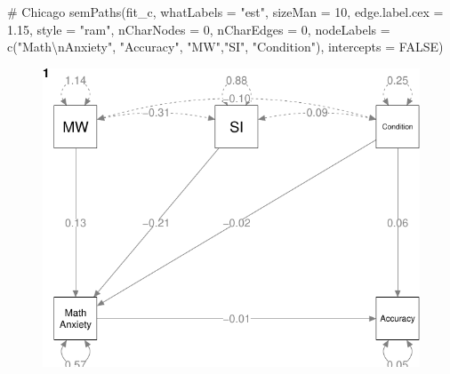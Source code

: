 \documentclass[
  letterpaper,
  DIV=11,
  numbers=noendperiod]{scrartcl}
\newenvironment{Shaded}{\begin{snugshade}}{\end{snugshade}}
\newcommand{\AttributeTok}[1]{\textcolor[rgb]{0.40,0.45,0.13}{#1}}
\newcommand{\CommentTok}[1]{\textcolor[rgb]{0.37,0.37,0.37}{#1}}
\newcommand{\ConstantTok}[1]{\textcolor[rgb]{0.56,0.35,0.01}{#1}}
\newcommand{\DecValTok}[1]{\textcolor[rgb]{0.68,0.00,0.00}{#1}}
\newcommand{\FloatTok}[1]{\textcolor[rgb]{0.68,0.00,0.00}{#1}}
\newcommand{\FunctionTok}[1]{\textcolor[rgb]{0.28,0.35,0.67}{#1}}
\newcommand{\NormalTok}[1]{\textcolor[rgb]{0.00,0.23,0.31}{#1}}
\newcommand{\SpecialCharTok}[1]{\textcolor[rgb]{0.37,0.37,0.37}{#1}}
\newcommand{\StringTok}[1]{\textcolor[rgb]{0.13,0.47,0.30}{#1}}
\begin{document}
\begin{Shaded}
\begin{Highlighting}[]
\CommentTok{\# Chicago}
\FunctionTok{semPaths}\NormalTok{(fit\_c,}
         \AttributeTok{whatLabels =} \StringTok{"est"}\NormalTok{,}
         \AttributeTok{sizeMan =} \DecValTok{10}\NormalTok{,}
         \AttributeTok{edge.label.cex =} \FloatTok{1.15}\NormalTok{,}
         \AttributeTok{style =} \StringTok{"ram"}\NormalTok{,}
         \AttributeTok{nCharNodes =} \DecValTok{0}\NormalTok{, }\AttributeTok{nCharEdges =} \DecValTok{0}\NormalTok{,}
         \AttributeTok{nodeLabels =} \FunctionTok{c}\NormalTok{(}\StringTok{"Math}\SpecialCharTok{\textbackslash{}n}\StringTok{Anxiety"}\NormalTok{, }\StringTok{"Accuracy"}\NormalTok{,}
                        \StringTok{"MW"}\NormalTok{,}\StringTok{"SI"}\NormalTok{, }\StringTok{"Condition"}\NormalTok{),}
         \AttributeTok{intercepts =} \ConstantTok{FALSE}\NormalTok{)}
\end{Highlighting}
\end{Shaded}

\begin{figure}[H]

{\centering \includegraphics{modeling2_files/figure-pdf/unnamed-chunk-13-1.pdf}

}

\end{figure}
\end{document}
